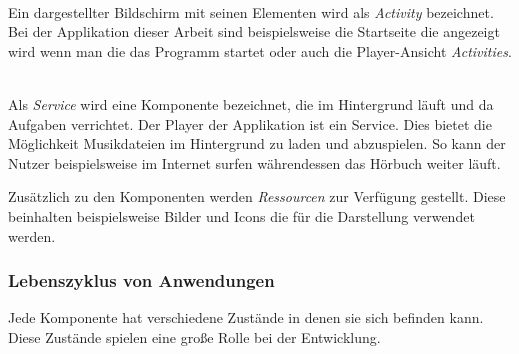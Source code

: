 \begin{description}[style=nextline]

	\item[Activities] \hfill \\
	Ein dargestellter Bildschirm mit seinen Elementen wird als \emph{Activity} bezeichnet. Bei der Applikation dieser Arbeit sind beispielsweise die Startseite die angezeigt wird wenn man die das Programm startet oder auch die Player-Ansicht \emph{Activities}.
	
	\item[Services] \hfill \\
	Als \emph{Service} wird eine Komponente bezeichnet, die im Hintergrund läuft und da Aufgaben verrichtet. Der Player der Applikation ist ein Service. Dies bietet die Möglichkeit Musikdateien im Hintergrund zu laden und abzuspielen. So kann der Nutzer beispielsweise im Internet surfen währendessen das Hörbuch weiter läuft.
	
\end{description}

Zusätzlich zu den Komponenten werden \emph{Ressourcen} zur Verfügung gestellt. Diese beinhalten beispielsweise Bilder und Icons die für die Darstellung verwendet werden.

\subsubsection{Lebenszyklus von Anwendungen}

Jede Komponente hat verschiedene Zustände in denen sie sich befinden kann. Diese Zustände spielen eine große Rolle bei der Entwicklung. 

